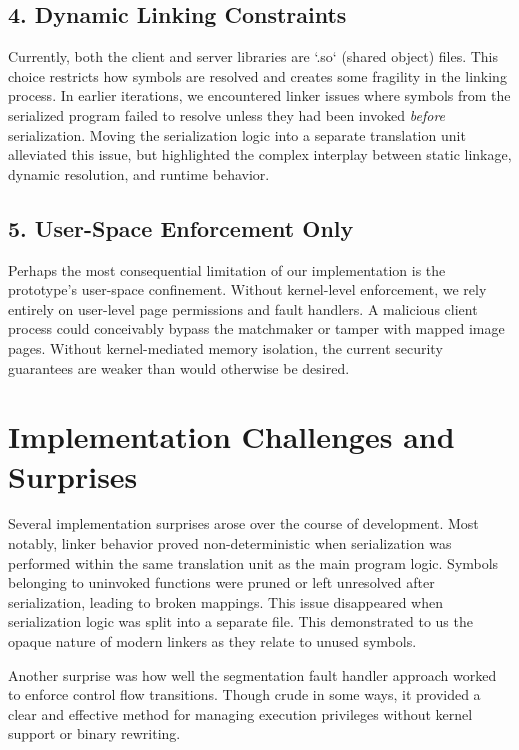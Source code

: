 \subsection*{4. Dynamic Linking Constraints}
Currently, both the client and server libraries are `.so` (shared object) files. This choice restricts how symbols are resolved and creates some fragility in the linking process. In earlier iterations, we encountered linker issues where symbols from the serialized program failed to resolve unless they had been invoked \textit{before} serialization. Moving the serialization logic into a separate translation unit alleviated this issue, but highlighted the complex interplay between static linkage, dynamic resolution, and runtime behavior.

\subsection*{5. User-Space Enforcement Only}
Perhaps the most consequential limitation of our implementation is the prototype’s user-space confinement. Without kernel-level enforcement, we rely entirely on user-level page permissions and fault handlers. A malicious client process could conceivably bypass the matchmaker or tamper with mapped image pages. Without kernel-mediated memory isolation, the current security guarantees are weaker than would otherwise be desired.

\section*{Implementation Challenges and Surprises}
Several implementation surprises arose over the course of development. Most notably, linker behavior proved non-deterministic when serialization was performed within the same translation unit as the main program logic. Symbols belonging to uninvoked functions were pruned or left unresolved after serialization, leading to broken mappings. This issue disappeared when serialization logic was split into a separate file. This demonstrated to us the opaque nature of modern linkers as they relate to unused symbols.

Another surprise was how well the segmentation fault handler approach worked to enforce control flow transitions. Though crude in some ways, it provided a clear and effective method for managing execution privileges without kernel support or binary rewriting.
